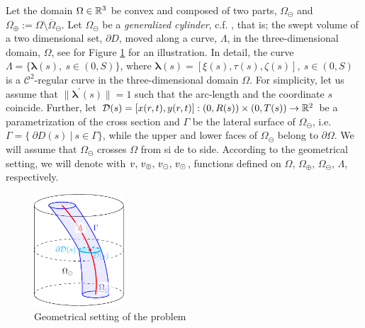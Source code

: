 \documentclass[r]{siamart171218}
\begin{document}
Let the domain $\Omega\in \mathbb{R}^3 $ be convex and composed of two parts, 
$\Omega_{\ominus}$ and $\Omega_{\oplus}:=\Omega\setminus\overline{\Omega}_{\ominus}$. 
Let 
$\Omega_{\ominus}$ be a \emph{generalized cylinder}, c.f.  \cite{MR1940257}, 
that is; the swept volume of a two dimensional set, $\partial D$, moved along a curve, $\Lambda$, in the three-dimensional domain, $\Omega$, see for Figure \ref{fig1} for an illustration. 
In detail, the curve 
$\Lambda = \{\boldsymbol \lambda(s), \ s\in(0,S)\}$,  where 
$\boldsymbol \lambda(s) = [\xi(s), \tau(s), \zeta(s)], \ s\in(0,S)$ is a $\mathcal{C}^2$-regular curve in the three-dimensional domain $\Omega$.
For simplicity, let us assume that $\|\boldsymbol \lambda^\prime(s)\|=1$ such that the arc-length and the coordinate $s$ coincide.
Further, let $\mathcal{D}(s) = [x(r,t),y(r,t)]: (0,R(s))\times(0,T(s)) \rightarrow \mathbb{R}^2$ be a parametrization of the cross section
and $\Gamma$ be the lateral surface of $\Omega_{\ominus}$, i.e.
$\Gamma=\{ \ \partial D(s) \  | \ s \in \Gamma\}$,
while the upper and lower faces of $\Omega_{\ominus}$ belong to $\partial\Omega$. 
We will assume that $\Omega_{\ominus}$ crosses $\Omega$ from si
de to side.
According to the geometrical setting, we will denote with $v,\,v_\oplus,\,v_\ominus,\,v_{\odot}$,
functions defined on $\Omega,\,\Omega_{\oplus},\,\Omega_{\ominus},\,\Lambda$, respectively.



\begin{figure}[H]
\begin{center}
\includegraphics[width=0.3\textwidth]{domain.pdf}
\end{center}
\caption{Geometrical setting of the problem}
\label{fig1}
\end{figure}



 
\end{document}
